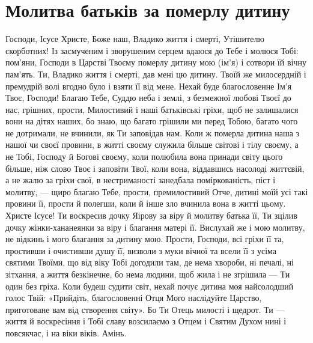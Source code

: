\documentclass[chapters.tex]{subfiles}
\begin{document}
\section{Молитва батьків за померлу дитину}
Господи, Ісусе Христе, Боже наш, Владико життя і смерті, Утішителю скорботних! Із засмученим і зворушеним серцем вдаюся до Тебе і молюся Тобі: пом’яни, Господи в Царстві Твоєму померлу дитину мою (ім’я) і сотвори їй вічну пам’ять. Ти, Владико життя і смерті, дав мені цю дитину. Твоїй же милосердній і премудрій волі вгодно було і взяти її від мене. Нехай буде благословенне Ім’я Твоє, Господи! Благаю Тебе, Суддю неба і землі, з безмежної любові Твоєї до нас, грішних, прости, Милостивий і наші батьківські гріхи, щоб не залишалися вони на дітях наших, бо знаю, що багато грішили ми перед Тобою, багато чого не дотримали, не вчинили, як Ти заповідав нам. Коли ж померла дитина наша з нашої чи своєї провини, в житті своєму служила більше світові і тілу своєму, а не Тобі, Господу й Богові своєму, коли полюбила вона принади світу цього більше, ніж слово Твоє і заповіти Твої, коли вона, віддавшись насолоді життєвій, а не жалю за гріхи свої, в нестриманості занедбала поміркованість, піст і молитву, — щиро благаю Тебе, прости, премилостивий Отче, дитині моїй усі такі провини її, прости й полегши, коли й інше зло вчинила вона в житті цьому. Христе Ісусе! Ти воскресив дочку Яірову за віру й молитву батька її, Ти зцілив дочку жінки-хананеянки за віру і благання матері її. Вислухай же і мою молитву, не відкинь і мого благання за дитину мою. Прости, Господи, всі гріхи її та, простивши і очистивши душу її, визволи з муки вічної та всели її з усіма святими Твоїми, що від віку Тобі догодили там, де нема хвороби, ні печалі, ні зітхання, а життя безкінечне, бо нема людини, щоб жила і не згрішила — Ти один без гріха. Коли будеш судити світ, нехай почує дитина моя найсолодший голос Твій: «Прийдіть, благословенні Отця Мого наслідуйте Царство, приготоване вам від створення світу». Бо Ти Отець милості і щедрот. Ти — життя й воскресіння і Тобі славу возсилаємо з Отцем і Святим Духом нині і повсякчас, і на віки віків. Амінь.
\end{document}
